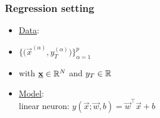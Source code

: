 \begin{frame}\frametitle{Regression setting}


\begin{itemize}
\item[] \underline{Data}:\\

    \item[]$
    \big\{ \big(\vec x^{(\alpha)}, y_{T}^{(\alpha)}\big)\big\}_{\alpha=1}^{p}
    $\\
    \item[] with $\underline{\mathbf{x}} \in \mathbb{R}^{N}$ and $y_{T} \in \mathbb{R}${}

\item[] \underline{Model}:\\
    linear neuron: $
        y(\vec x; \vec w, b) = \vec w^{\top} \vec x + b$


    
\end{itemize}



\end{frame}
